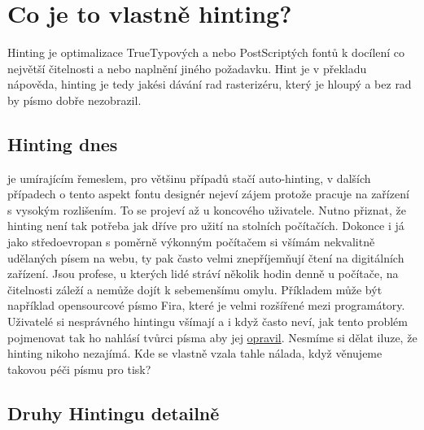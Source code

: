 \documentclass[a4paper]{article}
\begin{document}
\section{Co je to vlastně hinting?}

Hinting je optimalizace TrueTypových a nebo PostScriptých fontů k docílení co největší čitelnosti a nebo naplnění jiného požadavku. Hint je v překladu nápověda, hinting je tedy jakési dávání rad rasterizéru, který je hloupý a bez rad by písmo dobře nezobrazil. 


\subsection{Hinting dnes}

je umírajícím řemeslem, pro většinu případů stačí auto-hinting, v dalších případech o tento aspekt fontu designér nejeví zájem protože pracuje na zařízení s vysokým rozlišením. To se projeví až u koncového uživatele. Nutno přiznat, že hinting není tak potřeba jak dříve pro užití na stolních počítačích. Dokonce i já jako středoevropan s poměrně výkonným počítačem si všímám nekvalitně udělaných písem na webu, ty pak často velmi znepříjemňují čtení na digitálních zařízení. Jsou profese, u kterých lidé stráví několik hodin denně u počítače, na čitelnosti záleží a nemůže dojít k sebemenšímu omylu. Příkladem může být například opensourcové písmo Fira, které je velmi rozšířené mezi programátory.  Uživatelé si nesprávného hintingu všímají a i když často neví, jak tento problém pojmenovat tak ho nahlásí tvůrci písma aby jej \href{https://github.com/tonsky/FiraCode/issues?utf8=%E2%9C%93&q=hinting}{opravil}. Nesmíme si dělat iluze, že hinting nikoho nezajímá. Kde se vlastně vzala tahle nálada, když věnujeme takovou péči písmu pro tisk?


\subsection{Druhy Hintingu detailně}
\end{document}
